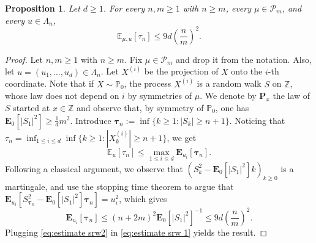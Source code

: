 \documentclass[11pt,a4paper]{article}
\numberwithin{equation}{section}
\theoremstyle{plain}
\newtheorem{Prop}[Thm]{Proposition}
\theoremstyle{definition}
\newcommand\bfc{\mathbf{c}}
\begin{document}
\begin{Prop}\label{prop: exponential moment exit time} Let $d\geq 1$. For every $n,m\geq 1$ with $n\geq m$, every $\mu \in \mathcal P_m$, and every $u\in \Lambda_n$,
\begin{equation}
	\mathbb E_{\mu,u}[\tau_n]\leq 9d\left(\frac{n}{m}\right)^2.
\end{equation}

\end{Prop}
\begin{proof} 
Let $n,m\geq 1$ with $n\geq m$. Fix $\mu \in \mathcal P_m$ and drop it from the notation. Also, let $u=(u_1,\ldots,u_d)\in \Lambda_n$. Let $X^{(i)}$ be the projection of $X$ onto the $i$-th coordinate. Note that if $X\sim \mathbb P_{0}$, the process $X^{(i)}$ is a random walk $S$ on $\mathbb Z$, whose law does not depend on $i$ by symmetries of $\mu$. We denote by $\mathbf P_x$ the law of $S$ started at $x\in \mathbb Z$ and observe that, by symmetry of $\mathbb P_0$, one has $\mathbf E_0[|S_1|^2]\geq \tfrac{1}{d}m^2$.  Introduce $\boldsymbol{\tau}_{n}:=\inf\{k\geq 1: |S_k|\geq n+1\}$. Noticing that $\tau_n=\inf_{1\leq i \leq d}\inf\{k\geq 1: |X_k^{(i)}|\geq n+1\}$, we get
\begin{equation}\label{eq:estimate srw 1}
	\mathbb E_u[\tau_n]\leq \max_{1\leq i\leq d}\mathbf E_{u_i}[\boldsymbol{\tau}_{n}].
\end{equation}
Following a classical argument, we observe that $(S_k^2-\mathbf E_0[|S_1|^2]k)_{k\geq 0}$ is a martingale, and use the stopping time theorem to argue that $\mathbf E_{u_i}[S^2_{\boldsymbol{\tau}_n}-\mathbf E_0[|S_1|^2]\boldsymbol{\tau}_n]=u_i^2$, which gives
\begin{equation}\label{eq:estimate srw2}
	\mathbf E_{u_i}[\boldsymbol{\tau}_n]\leq (n+2m)^2\mathbf E_0[|S_1|^2]^{-1}\leq 9d\left(\frac{n}{m}\right)^2.
\end{equation}
Plugging \eqref{eq:estimate srw2} in \eqref{eq:estimate srw 1} yields the result.
%

\end{proof}
\end{document}
